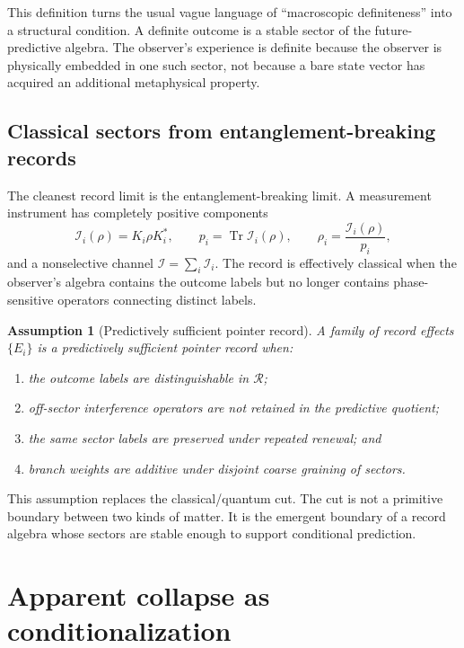\documentclass[11pt]{article}
\numberwithin{equation}{section}
\newtheorem{assumption}[theorem]{Assumption}
\theoremstyle{definition}
\theoremstyle{remark}
\newcommand{\Ralg}{\mathcal R}
\newcommand{\Instr}{\mathcal I}
\newcommand{\Tr}{\operatorname{Tr}}
\begin{document}
This definition turns the usual vague language of ``macroscopic definiteness'' into a structural condition.  A definite outcome is a stable sector of the future-predictive algebra.  The observer's experience is definite because the observer is physically embedded in one such sector, not because a bare state vector has acquired an additional metaphysical property.

\subsection{Classical sectors from entanglement-breaking records}

The cleanest record limit is the entanglement-breaking limit.  A measurement instrument has completely positive components
\begin{equation}
\label{eq:instrument-components}
  \Instr_i(\rho)=K_i\rho K_i^*,
  \qquad
  p_i=\Tr\Instr_i(\rho),
  \qquad
  \rho_i=\frac{\Instr_i(\rho)}{p_i},
\end{equation}
and a nonselective channel \(\Instr=\sum_i\Instr_i\).  The record is effectively classical when the observer's algebra contains the outcome labels but no longer contains phase-sensitive operators connecting distinct labels.

\begin{assumption}[Predictively sufficient pointer record]
\label{ass:pointer-record}
A family of record effects \(\{E_i\}\) is a predictively sufficient pointer record when:
\begin{enumerate}[label=\textup{(\roman*)},leftmargin=2.2em]
\item the outcome labels are distinguishable in \(\Ralg\);
\item off-sector interference operators are not retained in the predictive quotient;
\item the same sector labels are preserved under repeated renewal; and
\item branch weights are additive under disjoint coarse graining of sectors.
\end{enumerate}
\end{assumption}

This assumption replaces the classical/quantum cut.  The cut is not a primitive boundary between two kinds of matter.  It is the emergent boundary of a record algebra whose sectors are stable enough to support conditional prediction.

\section{Apparent collapse as conditionalization}
\label{sec:collapse}
\end{document}

